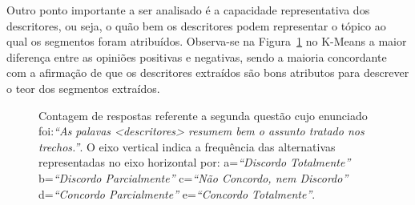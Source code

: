 Outro ponto importante a ser analisado é a capacidade representativa dos descritores, ou seja, o quão bem os descritores podem representar o tópico ao qual os segmentos foram atribuídos. Observa-se na Figura~\ref{fig:Q2} no K-Means a maior diferença entre as opiniões positivas e negativas, sendo a maioria concordante com a afirmação de que os descritores extraídos são bons atributos para descrever o teor dos segmentos extraídos.

\begin{figure}[!h] \centering     %

	\caption{Contagem de respostas referente a segunda questão cujo enunciado foi:\textit{``As palavas <descritores> resumem bem o assunto tratado nos trechos.''}. O eixo vertical indica a frequência das alternativas representadas no eixo horizontal por:
		a=\textit{``Discordo Totalmente''}
		b=\textit{``Discordo Parcialmente''}
		c=\textit{``Não Concordo, nem Discordo''}
		d=\textit{``Concordo Parcialmente''}
		e=\textit{``Concordo Totalmente''}.
	}
	\label{fig:Q2}
\end{figure}


